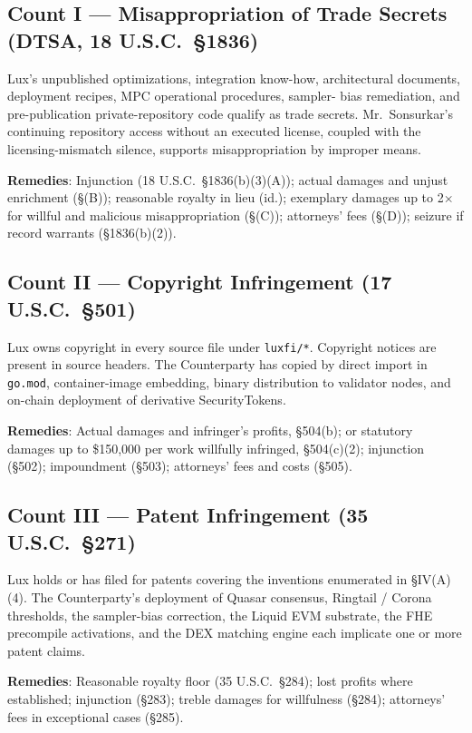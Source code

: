 \documentclass[11pt,letterpaper]{article}
\begin{document}
\subsection*{Count I --- Misappropriation of Trade Secrets (DTSA, 18 U.S.C.\ \S 1836)}

Lux's unpublished optimizations, integration know-how, architectural
documents, deployment recipes, MPC operational procedures, sampler-
bias remediation, and pre-publication private-repository code qualify
as trade secrets. Mr.\ Sonsurkar's continuing repository access
without an executed license, coupled with the licensing-mismatch
silence, supports misappropriation by improper means.

\textbf{Remedies}: Injunction (18 U.S.C.\ \S 1836(b)(3)(A)); actual
damages and unjust enrichment (\S (B)); reasonable royalty in lieu
(id.); exemplary damages up to 2$\times$ for willful and malicious
misappropriation (\S (C)); attorneys' fees (\S (D)); seizure if
record warrants (\S 1836(b)(2)).

\subsection*{Count II --- Copyright Infringement (17 U.S.C.\ \S 501)}

Lux owns copyright in every source file under \texttt{luxfi/*}.
Copyright notices are present in source headers. The Counterparty
has copied by direct import in \texttt{go.mod}, container-image
embedding, binary distribution to validator nodes, and on-chain
deployment of derivative SecurityTokens.

\textbf{Remedies}: Actual damages and infringer's profits, \S 504(b);
or statutory damages up to \$150,000 per work willfully infringed,
\S 504(c)(2); injunction (\S 502); impoundment (\S 503); attorneys'
fees and costs (\S 505).

\subsection*{Count III --- Patent Infringement (35 U.S.C.\ \S 271)}

Lux holds or has filed for patents covering the inventions
enumerated in \S IV(A)(4). The Counterparty's deployment of Quasar
consensus, Ringtail / Corona thresholds, the sampler-bias correction,
the Liquid EVM substrate, the FHE precompile activations, and the
DEX matching engine each implicate one or more patent claims.

\textbf{Remedies}: Reasonable royalty floor (35 U.S.C.\ \S 284); lost
profits where established; injunction (\S 283); treble damages for
willfulness (\S 284); attorneys' fees in exceptional cases (\S 285).
\end{document}
